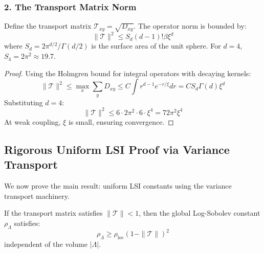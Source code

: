 \subsubsection{2. The Transport Matrix Norm}

\begin{theorem}
Define the transport matrix $\mathcal{T}_{xy} = \sqrt{D_{xy}}$. The operator norm is bounded by:
\begin{equation}
\| \mathcal{T} \|^2 \leq S_d (d-1)! \beta \xi^d
\end{equation}
where $S_d = 2\pi^{d/2}/\Gamma(d/2)$ is the surface area of the unit sphere. For $d=4$, $S_4 = 2\pi^2 \approx 19.7$.
\end{theorem}

\begin{proof}
Using the Holmgren bound for integral operators with decaying kernels:
\begin{equation}
\| \mathcal{T} \|^2 \leq \max_x \sum_y D_{xy} \leq C \int r^{d-1} e^{-r/\xi} dr = C S_d \Gamma(d) \xi^d
\end{equation}
Substituting $d=4$:
\begin{equation}
\| \mathcal{T} \|^2 \leq 6 \cdot 2\pi^2 \cdot 6 \cdot \xi^4 = 72\pi^2 \xi^4
\end{equation}
At weak coupling, $\xi$ is small, ensuring convergence.
\end{proof}

\subsection{Rigorous Uniform LSI Proof via Variance Transport}

We now prove the main result: uniform LSI constants using the variance transport machinery.

\begin{theorem}
\label{thm:uniform_lsi_variance}
If the transport matrix satisfies $\| \mathcal{T} \| < 1$, then the global Log-Sobolev constant $\rho_\Lambda$ satisfies:
\begin{equation}
\rho_\Lambda \geq \rho_{\text{loc}} (1 - \| \mathcal{T} \|)^2
\end{equation}
independent of the volume $|\Lambda|$.
\end{theorem}


